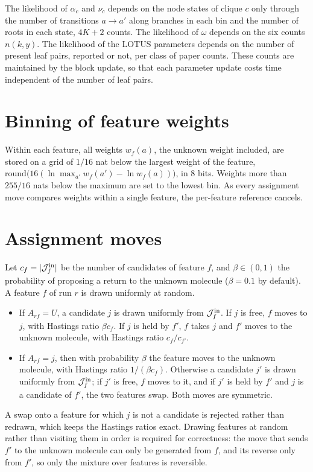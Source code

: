 \documentclass[
11pt, %
oneside, %
english, %
singlespacing, %
headsepline, %
chapterinoneline, %
]{MastersDoctoralThesis} %
\def\J{{\cal J}}
\def\Jin{\J^{\mathrm{in}}}
\begin{document}
The likelihood of $\alpha_c$ and $\nu_c$ depends on the node states of clique $c$ only through the number of transitions $a \to a'$ along branches in each bin and the number of roots in each state, $4K + 2$ counts. The likelihood of $\omega$ depends on the six counts $n(k, y)$. The likelihood of the LOTUS parameters depends on the number of present leaf pairs, reported or not, per class of paper counts. These counts are maintained by the block update, so that each parameter update costs time independent of the number of leaf pairs.

\section{Binning of feature weights}

Within each feature, all weights $w_f(a)$, the unknown weight included, are stored on a grid of $1/16$ nat below the largest weight of the feature, $\mathrm{round}\big(16(\ln \max_{a'} w_f(a') - \ln w_f(a))\big)$, in 8 bits. Weights more than $255/16$ nats below the maximum are set to the lowest bin. As every assignment move compares weights within a single feature, the per-feature reference cancels.

\section{Assignment moves}\label{sec:assignment-moves}

Let $c_f = |\Jin_f|$ be the number of candidates of feature $f$, and $\beta \in (0,1)$ the probability of proposing a return to the unknown molecule ($\beta = 0.1$ by default). A feature $f$ of run $r$ is drawn uniformly at random.
\begin{itemize}
	\item If $A_{rf} = U$, a candidate $j$ is drawn uniformly from $\Jin_f$. If $j$ is free, $f$ moves to $j$, with Hastings ratio $\beta c_f$. If $j$ is held by $f'$, $f$ takes $j$ and $f'$ moves to the unknown molecule, with Hastings ratio $c_f / c_{f'}$.
	\item If $A_{rf} = j$, then with probability $\beta$ the feature moves to the unknown molecule, with Hastings ratio $1/(\beta c_f)$. Otherwise a candidate $j'$ is drawn uniformly from $\Jin_f$; if $j'$ is free, $f$ moves to it, and if $j'$ is held by $f'$ and $j$ is a candidate of $f'$, the two features swap. Both moves are symmetric.
\end{itemize}
A swap onto a feature for which $j$ is not a candidate is rejected rather than redrawn, which keeps the Hastings ratios exact. Drawing features at random rather than visiting them in order is required for correctness: the move that sends $f'$ to the unknown molecule can only be generated from $f$, and its reverse only from $f'$, so only the mixture over features is reversible.
\end{document}
